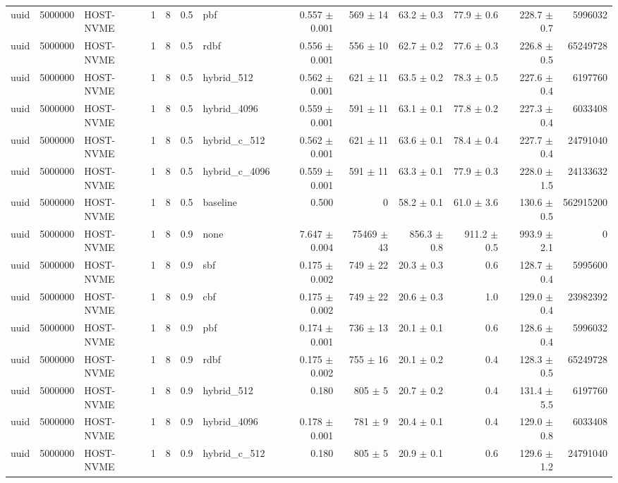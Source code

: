 \begin{tabular}{lllllllrrrrrr}
uuid & 5000000 & HOST-NVME & 1 & 8 & 0.5 & pbf & 0.557 $\pm$ 0.001 & 569 $\pm$ 14 & 63.2 $\pm$ 0.3 & 77.9 $\pm$ 0.6 & 228.7 $\pm$ 0.7 & 5996032 \\
uuid & 5000000 & HOST-NVME & 1 & 8 & 0.5 & rdbf & 0.556 $\pm$ 0.001 & 556 $\pm$ 10 & 62.7 $\pm$ 0.2 & 77.6 $\pm$ 0.3 & 226.8 $\pm$ 0.5 & 65249728 \\
uuid & 5000000 & HOST-NVME & 1 & 8 & 0.5 & hybrid\_512 & 0.562 $\pm$ 0.001 & 621 $\pm$ 11 & 63.5 $\pm$ 0.2 & 78.3 $\pm$ 0.5 & 227.6 $\pm$ 0.4 & 6197760 \\
uuid & 5000000 & HOST-NVME & 1 & 8 & 0.5 & hybrid\_4096 & 0.559 $\pm$ 0.001 & 591 $\pm$ 11 & 63.1 $\pm$ 0.1 & 77.8 $\pm$ 0.2 & 227.3 $\pm$ 0.4 & 6033408 \\
uuid & 5000000 & HOST-NVME & 1 & 8 & 0.5 & hybrid\_c\_512 & 0.562 $\pm$ 0.001 & 621 $\pm$ 11 & 63.6 $\pm$ 0.1 & 78.4 $\pm$ 0.4 & 227.7 $\pm$ 0.4 & 24791040 \\
uuid & 5000000 & HOST-NVME & 1 & 8 & 0.5 & hybrid\_c\_4096 & 0.559 $\pm$ 0.001 & 591 $\pm$ 11 & 63.3 $\pm$ 0.1 & 77.9 $\pm$ 0.3 & 228.0 $\pm$ 1.5 & 24133632 \\
uuid & 5000000 & HOST-NVME & 1 & 8 & 0.5 & baseline & 0.500 & 0 & 58.2 $\pm$ 0.1 & 61.0 $\pm$ 3.6 & 130.6 $\pm$ 0.5 & 562915200 \\
uuid & 5000000 & HOST-NVME & 1 & 8 & 0.9 & none & 7.647 $\pm$ 0.004 & 75469 $\pm$ 43 & 856.3 $\pm$ 0.8 & 911.2 $\pm$ 0.5 & 993.9 $\pm$ 2.1 & 0 \\
uuid & 5000000 & HOST-NVME & 1 & 8 & 0.9 & sbf & 0.175 $\pm$ 0.002 & 749 $\pm$ 22 & 20.3 $\pm$ 0.3 & 0.6 & 128.7 $\pm$ 0.4 & 5995600 \\
uuid & 5000000 & HOST-NVME & 1 & 8 & 0.9 & cbf & 0.175 $\pm$ 0.002 & 749 $\pm$ 22 & 20.6 $\pm$ 0.3 & 1.0 & 129.0 $\pm$ 0.4 & 23982392 \\
uuid & 5000000 & HOST-NVME & 1 & 8 & 0.9 & pbf & 0.174 $\pm$ 0.001 & 736 $\pm$ 13 & 20.1 $\pm$ 0.1 & 0.6 & 128.6 $\pm$ 0.4 & 5996032 \\
uuid & 5000000 & HOST-NVME & 1 & 8 & 0.9 & rdbf & 0.175 $\pm$ 0.002 & 755 $\pm$ 16 & 20.1 $\pm$ 0.2 & 0.4 & 128.3 $\pm$ 0.5 & 65249728 \\
uuid & 5000000 & HOST-NVME & 1 & 8 & 0.9 & hybrid\_512 & 0.180 & 805 $\pm$ 5 & 20.7 $\pm$ 0.2 & 0.4 & 131.4 $\pm$ 5.5 & 6197760 \\
uuid & 5000000 & HOST-NVME & 1 & 8 & 0.9 & hybrid\_4096 & 0.178 $\pm$ 0.001 & 781 $\pm$ 9 & 20.4 $\pm$ 0.1 & 0.4 & 129.0 $\pm$ 0.8 & 6033408 \\
uuid & 5000000 & HOST-NVME & 1 & 8 & 0.9 & hybrid\_c\_512 & 0.180 & 805 $\pm$ 5 & 20.9 $\pm$ 0.1 & 0.6 & 129.6 $\pm$ 1.2 & 24791040 \\

\end{tabular}
